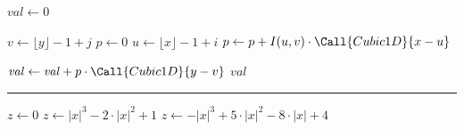 \begin{program}
\caption{Quellcode zu Algorithmus \ref{alg:Example}. Wie ersichtlich, können
hier auch beliebig Leerzeilen verwendet werden, was die Lesbarkeit deutlich
verbessert.}
\label{prog:AlgExample}
\begin{LaTeXCode}
\begin{algorithm}
\caption{Beispiel für einen mit dem Paket \texttt{algpseudocodex}
gesetzten Algorithmus zur bikubischen Interpolation in 2D (aus
\cite{BurgerBurge2022}). Die in den Zeilen \ref{alg:wcub1} und
\ref{alg:wcub2} verwendete Funktion $\Call{Cubic1D}{x}$ berechnet 
die Gewichtung des Werts für die eindimensionale Position $x$.}
\label{alg:Example}

\begin{algorithmic}[1]     %
 
	
	\State $\mathit{val} \gets 0$
	
	 
		\State $v \gets \lfloor y \rfloor - 1 + j$
		\State $p \gets 0$
		 
			\State $u \gets \lfloor x \rfloor - 1 + i$
			\State $p \gets p + I(u,v) \cdot \Call{Cubic1D}{x - u}$	\label{alg:wcub1}
		\EndFor		
		
		
		\State $\mathit{val} \gets \mathit{val} + p \cdot \Call{Cubic1D}{y - v}$
				\label{alg:wcub2}
	\EndFor
	\State\Return $\mathit{val}$
\EndFunction

\medskip	%
\hrule

 
	\State $z \gets 0$
			\State $z \gets |x|^3 - 2 \cdot |x|^2 + 1$
			\State $z \gets -|x|^3 + 5 \cdot |x|^2 - 8 \cdot |x| + 4$
		\EndIf
		\State{}
\EndFunction

\end{algorithmic}
\end{algorithm}
\end{LaTeXCode}
\end{program}
